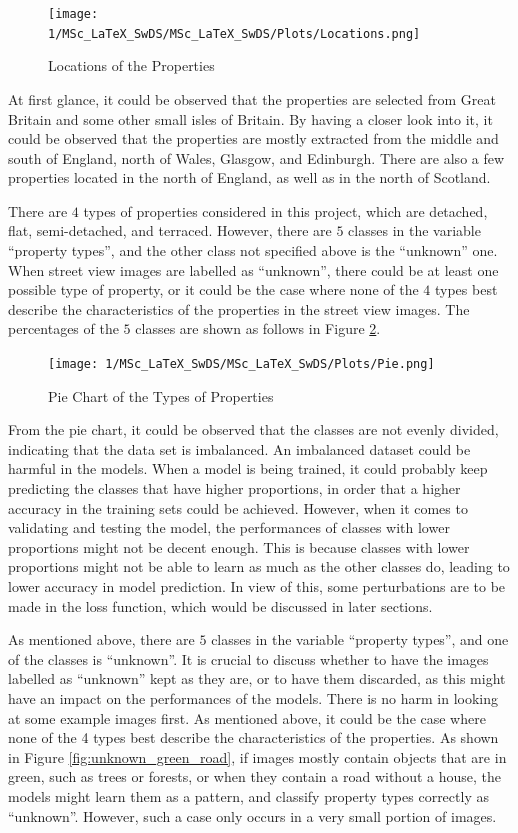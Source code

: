 \documentclass[11pt,twoside]{article}
\numberwithin{Theorem}{section}
\numberwithin{Definition}{section}
\numberwithin{Lemma}{section}
\numberwithin{Algorithm}{section}
\numberwithin{equation}{section}
\begin{document}
\begin{figure}[h]
\centering
\texttt{[image: 1/MSc\_LaTeX\_SwDS/MSc\_LaTeX\_SwDS/Plots/Locations.png]}
\caption{Locations of the Properties}
\label{fig:locations}
\end{figure}

At first glance, it could be observed that the properties are selected from Great Britain and some other small isles of Britain. By having a closer look into it, it could be observed that the properties are mostly extracted from the middle and south of England, north of Wales, Glasgow, and Edinburgh. There are also a few properties located in the north of England, as well as in the north of Scotland.

There are $4$ types of properties considered in this project, which are detached, flat, semi-detached, and terraced. However, there are $5$ classes in the variable “property types”, and the other class not specified above is the “unknown” one. When street view images are labelled as “unknown”, there could be at least one possible type of property, or it could be the case where none of the $4$ types best describe the characteristics of the properties in the street view images. The percentages of the $5$ classes are shown as follows in Figure \ref{fig:pie}. 

\begin{figure}[h]
\centering
\texttt{[image: 1/MSc\_LaTeX\_SwDS/MSc\_LaTeX\_SwDS/Plots/Pie.png]}
\caption{Pie Chart of the Types of Properties}
\label{fig:pie}
\end{figure}

From the pie chart, it could be observed that the classes are not evenly divided, indicating that the data set is imbalanced. An imbalanced dataset could be harmful in the models. When a model is being trained, it could probably keep predicting the classes that have higher proportions, in order that a higher accuracy in the training sets could be achieved. However, when it comes to validating and testing the model, the performances of classes with lower proportions might not be decent enough. This is because classes with lower proportions might not be able to learn as much as the other classes do, leading to lower accuracy in model prediction. In view of this, some perturbations are to be made in the loss function, which would be discussed in later sections.

As mentioned above, there are $5$ classes in the variable “property types”, and one of the classes is “unknown”. It is crucial to discuss whether to have the images labelled as “unknown” kept as they are, or to have them discarded, as this might have an impact on the performances of the models. There is no harm in looking at some example images first. As mentioned above, it could be the case where none of the 4 types best describe the characteristics of the properties. As shown in Figure \ref{fig:unknown_green_road}, if images mostly contain objects that are in green, such as trees or forests, or when they contain a road without a house, the models might learn them as a pattern, and classify property types correctly as “unknown”. However, such a case only occurs in a very small portion of images. 
\end{document}
